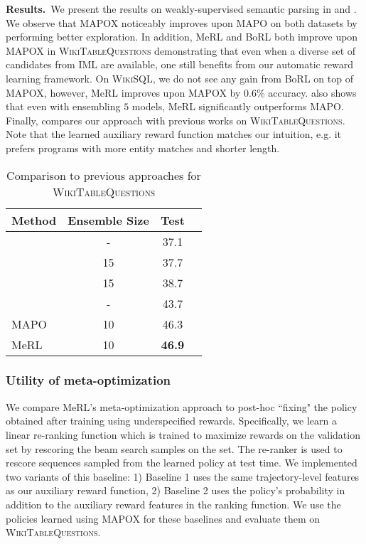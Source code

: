 {\bf Results.}~We present the results on weakly-supervised semantic
parsing in 
and . We observe that MAPOX noticeably
improves upon MAPO on both datasets by performing better exploration.
In addition, MeRL and BoRL both improve upon MAPOX
in \textsc{WikiTableQuestions} demonstrating that even when a diverse
set of candidates from IML are available, one still benefits from our
automatic reward learning framework. On \textsc{WikiSQL}, we do
not see any gain from BoRL on top of MAPOX, however, MeRL improves
upon MAPOX by 0.6\% accuracy.  also shows
that even with ensembling $5$ models, MeRL significantly outperforms
MAPO.  Finally,  compares our approach with
previous works on \textsc{WikiTableQuestions}. Note that the learned 
auxiliary reward function matches our intuition, e.g. it prefers 
programs with more entity matches and shorter length.

\begin{table}[t]
\caption{Comparison to previous approaches for \textsc{WikiTableQuestions}}
\label{wikitable_results}
\begin{center}
\begin{small}
\begin{tabular}{lccr}
\toprule
Method & Ensemble Size & Test \\
\midrule
\citet{pasupat2015tables}  & - & 37.1 \\
\citet{Neelakantan2016LearningAN} & 15 & 37.7 \\
\citet{haug2018NeuralMR} & 15 & 38.7 \\
\citet{zhang2017macro} & - & 43.7 \\
MAPO~\cite{NIPS2018_8204} & 10 & 46.3 \\
MeRL & 10  & \textbf{46.9} \\
\bottomrule
\end{tabular}
\end{small}
\end{center}
\vspace*{-0.25in}
\end{table}

\subsubsection{Utility of meta-optimization}
We compare MeRL's meta-optimization approach to post-hoc ``fixing" the policy obtained after training using underspecified rewards. Specifically, we learn a linear re-ranking function which is trained to maximize rewards on the validation set by rescoring the beam search samples on the set. The re-ranker is used to rescore sequences sampled from the learned policy at test time. We implemented two variants of this baseline: 1) Baseline 1 uses the same trajectory-level features as our auxiliary reward function, 2) Baseline 2 uses the policy's probability in addition to the auxiliary reward features in the ranking function. We use the policies learned using MAPOX for these baselines and evaluate them on \textsc{WikiTableQuestions}.

